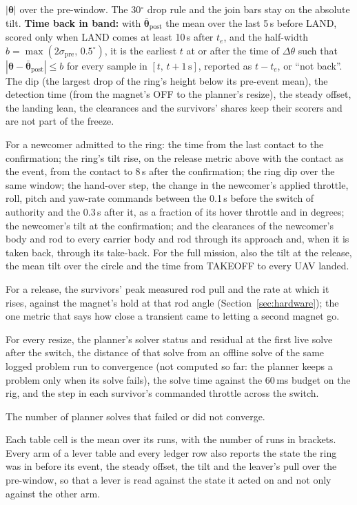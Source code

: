 \begin{description}
    $|\boldsymbol{\theta}|$ over the pre-window. The 30$^\circ$ drop rule and the join bars stay on the
    absolute tilt. \textbf{Time back in band:} with $\bar{\boldsymbol{\theta}}_{\mathrm{post}}$ the mean over
    the last 5\,s before LAND, scored only when LAND comes at least 10\,s after $t_e$, and the half-width
    $b=\max(2\sigma_{\mathrm{pre}},\,0.5^\circ)$, it is the earliest $t$ at or after the time of $\Delta\theta$
    such that $|\boldsymbol{\theta}-\bar{\boldsymbol{\theta}}_{\mathrm{post}}|\le b$ for every sample in
    $[t,\,t+1\,\mathrm{s}]$, reported as $t-t_e$, or ``not back''. The dip (the largest drop of the ring's
    height below its pre-event mean), the detection time (from the magnet's OFF to the planner's resize), the
    steady offset, the landing lean, the clearances and the survivors' shares keep their scorers and are not
    part of the freeze.
    \item[Join metrics] For a newcomer admitted to the ring: the time from the last contact to the confirmation; the ring's
    tilt rise, on the release metric above with the contact as the event, from the contact to 8\,s after the
    confirmation; the ring dip over the same window; the hand-over step, the change in the newcomer's applied
    throttle, roll, pitch and yaw-rate commands between the 0.1\,s before the switch of authority and the 0.3\,s
    after it, as a fraction of its hover throttle and in degrees; the newcomer's tilt at the confirmation; and the
    clearances of the newcomer's body and rod to every carrier body and rod through its approach and, when it is
    taken back, through its take-back. For the full mission, also the tilt at the release, the mean tilt over the
    circle and the time from TAKEOFF to every UAV landed.
    \item[Magnet margin] For a release, the survivors' peak measured rod pull and the rate at which it rises,
    against the magnet's hold at that rod angle (Section~\ref{sec:hardware}); the one metric that says how close a
    transient came to letting a second magnet go.
    \item[Switch validation] For every resize, the planner's solver status and residual at the first live solve
    after the switch, the distance of that solve from an offline solve of the same logged problem run to
    convergence (not computed so far: the planner keeps a problem only when its solve fails), the solve time against the 60\,ms budget on the rig, and the step in each survivor's commanded
    throttle across the switch.
    \item[Solver health] The number of planner solves that failed or did not converge.
\end{description}
Each table cell is the mean over its runs, with the number of runs in brackets. Every arm of a lever table and
every ledger row also reports the state the ring was in before its event, the steady offset, the tilt and the
leaver's pull over the pre-window, so that a lever is read against the state it acted on and not only against
the other arm.

